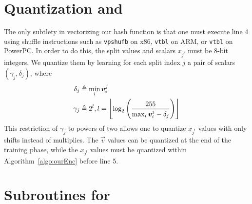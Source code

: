 
\section{Quantization and \oursHash} \label{sec:hashQuantize}

The only subtlety in vectorizing our hash function is that one must execute line 4 using shuffle instructions such as \texttt{vpshufb} on x86, \texttt{vtbl} on ARM, or \texttt{vtbl} on PowerPC. In order to do this, the split values and scalars $x_{j^t}$ must be 8-bit integers. We quantize them by learning for each split index $j$ a pair of scalars $(\gamma_j, \delta_j)$, where
\begin{align}
    \delta_j &\triangleq \min_i \bm{v}^j_i \label{eq:offset} \\
    \gamma_j &\triangleq 2^l, l = \left \lfloor  \log_2 \left( \frac{255}{\max_i \bm{v}^j_i - \delta_j} \right) \label{eq:scale}  \right \rfloor
\end{align}
This restriction of $\gamma_j$ to powers of two allows one to quantize $x_{j^t}$ values with only shifts instead of multiplies. The $\vec{v}$ values can be quantized at the end of the training phase, while the $x_{j^t}$ values must be quantized within Algorithm~\ref{algo:ourEnc} before line 5.

\vfill\break  %
\section{Subroutines for \oursHash} \label{sec:optimalSplitVal}


